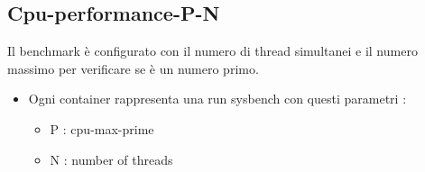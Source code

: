 \documentclass[a4paper, 11pt]{article}
\begin{document}
\subsection{Cpu-performance-P-N}
Il benchmark è configurato con il numero di thread simultanei e il numero massimo per verificare se è un numero primo.
\begin{flushleft}
\begin{itemize}
\item Ogni container rappresenta una run sysbench con questi parametri :
\begin{itemize}
\item P : cpu-max-prime
\item N : number of threads
\end{itemize}
\end{itemize}
\end{flushleft}
\end{document}
